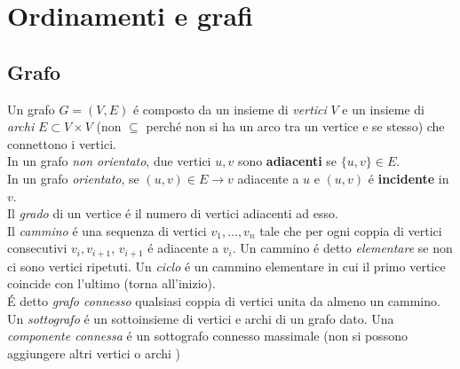 \documentclass{article}
\begin{document}
\section{Ordinamenti e grafi}

\subsection{Grafo}
Un grafo $G = (V,E)$ é composto da un insieme di \textit{vertici} $V$ e un insieme di \textit{archi} $E \subset V \times V$ (non $\subseteq$ perché non si ha un arco tra un vertice e se stesso) che connettono i vertici.\\
In un grafo \textit{non orientato}, due vertici $u,v$ sono \textbf{adiacenti} se $\{u,v\} \in E$.\\
In un grafo \textit{orientato}, se $(u,v) \in E \rightarrow v$ adiacente a $u$ e $(u,v)$ é \textbf{incidente} in $v$.\\
Il \textit{grado} di un vertice é il numero di vertici adiacenti ad esso.\\
Il \textit{cammino} é una sequenza di vertici $v_1, \dots, v_n$ tale che per ogni coppia di vertici consecutivi $v_i, v_{i+1}$, $v_{i+1}$ é adiacente a $v_i$. Un cammino é detto \textit{elementare} se non ci sono vertici ripetuti. Un \textit{ciclo} é un cammino elementare in cui il primo vertice coincide con l'ultimo (torna all'inizio).\\
É detto \textit{grafo connesso} qualsiasi coppia di vertici unita da almeno un cammino.\\
Un \textit{sottografo} é un sottoinsieme di vertici e archi di un grafo dato. Una \textit{componente connessa} é un sottografo connesso massimale (non si possono aggiungere altri vertici o archi )
\end{document}
